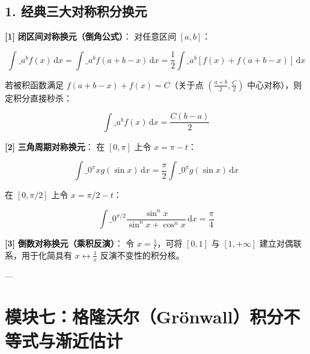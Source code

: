 \documentclass[11pt,a4paper,UTF8]{ctexart}
\begin{document}
\subsection{1. 经典三大对称积分换元}
\begin{solbox}[分步推导与答题规范]
\textbf{[1]}  \textbf{闭区间对称换元（倒角公式）}：
对任意区间 $[a, b]$：

\begin{equation*}
\int\_a^b f(x)\,\mathrm{d}x = \int\_a^b f(a + b - x)\,\mathrm{d}x = \frac{1}{2}\int\_a^b [f(x) + f(a + b - x)]\,\mathrm{d}x
\end{equation*}

若被积函数满足 $f(a + b - x) + f(x) = C$（关于点 $\left(\frac{a+b}{2}, \frac{C}{2}\right)$ 中心对称），则定积分直接秒杀：

\begin{equation*}
\int\_a^b f(x)\,\mathrm{d}x = \frac{C(b - a)}{2}
\end{equation*}


\textbf{[2]}  \textbf{三角周期对称换元}：
在 $[0, \pi]$ 上令 $x = \pi - t$：

\begin{equation*}
\int\_0^\pi x g(\sin x)\,\mathrm{d}x = \frac{\pi}{2}\int\_0^\pi g(\sin x)\,\mathrm{d}x
\end{equation*}

在 $[0, \pi/2]$ 上令 $x = \pi/2 - t$：

\begin{equation*}
\int\_0^{\pi/2} \frac{\sin^n x}{\sin^n x + \cos^n x}\,\mathrm{d}x = \frac{\pi}{4}
\end{equation*}


\textbf{[3]}  \textbf{倒数对称换元（乘积反演）}：
令 $x = \frac{1}{t}$，可将 $[0, 1]$ 与 $[1, +\infty]$ 建立对偶联系，用于化简具有 $x \leftrightarrow \frac{1}{x}$ 反演不变性的积分核。
\end{solbox}

---


\section{模块七：格隆沃尔（Grönwall）积分不等式与渐近估计}
\end{document}
